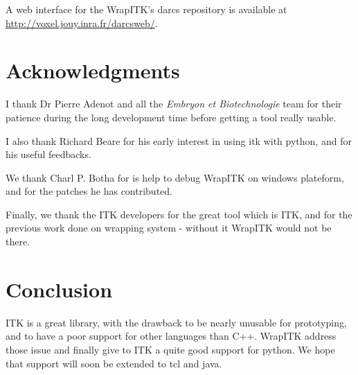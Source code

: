 \documentclass{InsightArticle}
\begin{document}
A web interface \cite{DarcswebWebSite} for the WrapITK's darcs
repository is available at \url{http://voxel.jouy.inra.fr/darcsweb/}.


\section{Acknowledgments}
I thank Dr Pierre Adenot and all the {\em Embryon et Biotechnologie} team for their
patience during the long development time before getting a tool really usable.

I also thank Richard Beare for his early interest in using itk with python, and for
his useful feedbacks.

We thank Charl P. Botha for is help to debug WrapITK on windows plateform, and for the
patches he has contributed.

Finally, we thank the ITK developers for the great tool which is ITK, and for the
previous work done on wrapping system - without it WrapITK would not be there.


\section{Conclusion}

ITK is a great library, with the drawback to be nearly unusable for prototyping,
and to have a poor support for other languages than C++. WrapITK address those
issue and finally give to ITK a quite good support for python. We hope that support
will soon be extended to tcl and java.



\appendix





\nocite{ITKSoftwareGuide}
\end{document}
